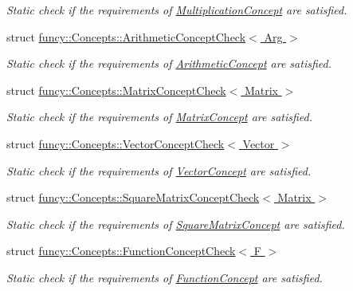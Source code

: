 \begin{DoxyCompactItemize}
\begin{DoxyCompactList}\small\item\em Static check if the requirements of \hyperlink{structfuncy_1_1Concepts_1_1MultiplicationConcept}{Multiplication\-Concept} are satisfied. \end{DoxyCompactList}\item 
struct \hyperlink{structfuncy_1_1Concepts_1_1ArithmeticConceptCheck}{funcy\-::\-Concepts\-::\-Arithmetic\-Concept\-Check$<$ Arg $>$}
\begin{DoxyCompactList}\small\item\em Static check if the requirements of \hyperlink{structfuncy_1_1Concepts_1_1ArithmeticConcept}{Arithmetic\-Concept} are satisfied. \end{DoxyCompactList}\item 
struct \hyperlink{structfuncy_1_1Concepts_1_1MatrixConceptCheck}{funcy\-::\-Concepts\-::\-Matrix\-Concept\-Check$<$ Matrix $>$}
\begin{DoxyCompactList}\small\item\em Static check if the requirements of \hyperlink{structfuncy_1_1Concepts_1_1MatrixConcept}{Matrix\-Concept} are satisfied. \end{DoxyCompactList}\item 
struct \hyperlink{structfuncy_1_1Concepts_1_1VectorConceptCheck}{funcy\-::\-Concepts\-::\-Vector\-Concept\-Check$<$ Vector $>$}
\begin{DoxyCompactList}\small\item\em Static check if the requirements of \hyperlink{structfuncy_1_1Concepts_1_1VectorConcept}{Vector\-Concept} are satisfied. \end{DoxyCompactList}\item 
struct \hyperlink{structfuncy_1_1Concepts_1_1SquareMatrixConceptCheck}{funcy\-::\-Concepts\-::\-Square\-Matrix\-Concept\-Check$<$ Matrix $>$}
\begin{DoxyCompactList}\small\item\em Static check if the requirements of \hyperlink{structfuncy_1_1Concepts_1_1SquareMatrixConcept}{Square\-Matrix\-Concept} are satisfied. \end{DoxyCompactList}\item 
struct \hyperlink{structfuncy_1_1Concepts_1_1FunctionConceptCheck}{funcy\-::\-Concepts\-::\-Function\-Concept\-Check$<$ F $>$}
\begin{DoxyCompactList}\small\item\em Static check if the requirements of \hyperlink{structfuncy_1_1Concepts_1_1FunctionConcept}{Function\-Concept} are satisfied. \end{DoxyCompactList}\end{DoxyCompactItemize}
